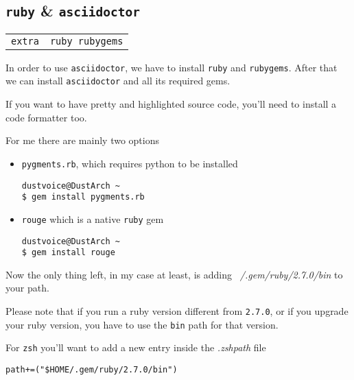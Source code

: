 \documentclass[9pt]{report}
\newenvironment{NOTE}
{\begin{tcolorbox}[colback=admonitionBG,coltitle=draculaFG,colframe=draculaBlue,colbacktitle=draculaBlue,title=NOTE]}
{\end{tcolorbox}}
\newenvironment{packagetable}
{\begin{longtabu}to \textwidth [b]{X[1,r]|X[1,l]}}
{\end{longtabu}}
\begin{document}
\hypertarget{x-ruby-and-asciidoctor}{\subsection{\texttt{ruby} \& \texttt{asciidoctor}}}
\begin{packagetable}
    \texttt{extra} & \texttt{ruby rubygems} \\ 
\end{packagetable}

In order to use \texttt{asciidoctor}, we have to install \texttt{ruby} and \texttt{rubygems}.
After that we can install \texttt{asciidoctor} and all its required gems.


\begin{NOTE}
    If you want to have pretty and highlighted source code, you’ll need to install a code formatter too.


    For me there are mainly two options


    \begin{itemize}

        \item \texttt{pygments.rb}, which requires python to be installed

            \begin{verbatim}
dustvoice@DustArch ~
$ gem install pygments.rb
            \end{verbatim}
        \item \texttt{rouge} which is a native \texttt{ruby} gem

            \begin{verbatim}
dustvoice@DustArch ~
$ gem install rouge
            \end{verbatim}
    \end{itemize}

\end{NOTE}
Now the only thing left, in my case at least, is adding \textit{~/.gem/ruby/2.7.0/bin} to your path.


\begin{NOTE}
    Please note that if you run a ruby version different from \texttt{2.7.0}, or if you upgrade your ruby version, you have to use the \texttt{bin} path for that version.

\end{NOTE}
For \texttt{zsh} you’ll want to add a new entry inside the \textit{.zshpath} file


\begin{verbatim}
path+=("$HOME/.gem/ruby/2.7.0/bin")
\end{verbatim}
\end{document}
